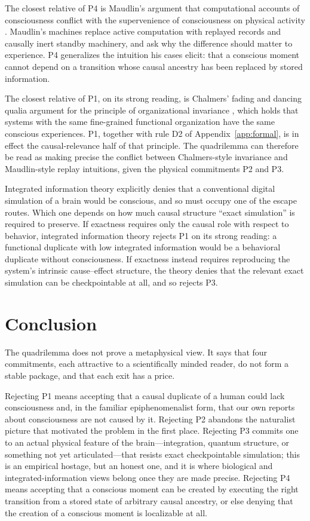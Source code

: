 \documentclass[11pt]{article}
\begin{document}
The closest relative of P4 is Maudlin's argument that computational accounts
of consciousness conflict with the supervenience of consciousness on physical
activity \cite{maudlin1989}. Maudlin's machines replace active computation
with replayed records and causally inert standby machinery, and ask why the
difference should matter to experience. P4 generalizes the intuition his cases
elicit: that a conscious moment cannot depend on a transition whose causal
ancestry has been replaced by stored information.

The closest relative of P1, on its strong reading, is Chalmers' fading and
dancing qualia argument for the principle of organizational invariance
\cite{chalmers1996}, which holds that systems with the same fine-grained
functional organization have the same conscious experiences. P1, together with
rule D2 of Appendix~\ref{app:formal}, is in effect the causal-relevance half
of that principle. The quadrilemma can therefore be read as making precise the
conflict between Chalmers-style invariance and Maudlin-style replay
intuitions, given the physical commitments P2 and P3.

Integrated information theory \cite{tononi2008,tononikoch2015} explicitly
denies that a conventional digital simulation of a brain would be conscious,
and so must occupy one of the escape routes. Which one depends on how much
causal structure ``exact simulation'' is required to preserve. If exactness
requires only the causal role with respect to behavior, integrated information
theory rejects P1 on its strong reading: a functional duplicate with low
integrated information would be a behavioral duplicate without consciousness.
If exactness instead requires reproducing the system's intrinsic cause--effect
structure, the theory denies that the relevant exact simulation can be
checkpointable at all, and so rejects P3.

\section{Conclusion}

The quadrilemma does not prove a metaphysical view. It says that four
commitments, each attractive to a scientifically minded reader, do not form a
stable package, and that each exit has a price.

Rejecting P1 means accepting that a causal duplicate of a human could lack
consciousness and, in the familiar epiphenomenalist form, that our own reports
about consciousness are not caused by it. Rejecting P2 abandons the naturalist
picture that motivated the problem in the first place. Rejecting P3 commits
one to an actual physical feature of the brain---integration, quantum
structure, or something not yet articulated---that resists exact
checkpointable simulation; this is an empirical hostage, but an honest one,
and it is where biological and integrated-information views belong once they
are made precise. Rejecting P4 means accepting that a conscious moment can be
created by executing the right transition from a stored state of arbitrary
causal ancestry, or else denying that the creation of a conscious moment is
localizable at all.
\end{document}
